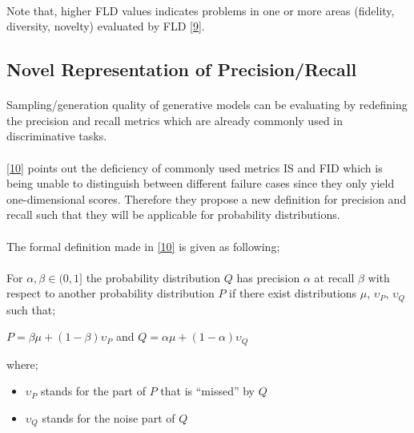 \documentclass{article}
\begin{document}
    \paragraph{}
    Note that, higher FLD values indicates problems in one or more areas (fidelity, diversity, novelty) evaluated by FLD \hyperref[sec: ref9]{[9]}.

    \subsection{Novel Representation of Precision/Recall}
    \paragraph{}
    Sampling/generation quality of generative models can be evaluating by redefining the precision and recall metrics which are already commonly used in discriminative tasks.
    \paragraph{}
    \hyperref[sec: ref10]{[10]} points out the deficiency of commonly used metrics IS and FID which is being unable to distinguish between different failure cases since they only yield one-dimensional scores. Therefore they propose a new definition for precision and recall such that they will be applicable for probability distributions.

    \paragraph{}
    The formal definition made in \hyperref[sec: ref10]{[10]} is given as following;
    \paragraph{}
    For $\alpha, \beta \in (0, 1]$ the probability distribution $Q$ has precision $\alpha$ at recall $\beta$ with respect to another probability distribution $P$ if there exist distributions $\mu$, $\upsilon_P$, $\upsilon_Q$ such that;
    \begin{center}
        $P = \beta \mu + (1 - \beta) \upsilon_P$ and $Q = \alpha \mu + (1 - \alpha) \upsilon_Q$
    \end{center}
    where; 
    \begin{itemize}
        \item $\upsilon_P$ stands for the part of $P$ that is “missed” by $Q$
        \item $\upsilon_Q$ stands for  the noise part of $Q$ 
    \end{itemize}
\end{document}

